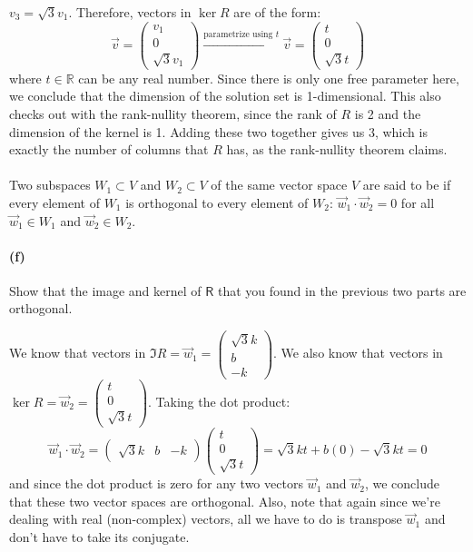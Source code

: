 \documentclass{article}
\begin{document}
\begin{solution}
	$v_3 = \sqrt{3} v_1$. Therefore, vectors in $\ker R$ are of the form: 
	\[
		\vec v = \begin{pmatrix} v_1\\0\\\sqrt{3} v_1 \end{pmatrix} \xrightarrow{\text{parametrize using $t$}} \vec v = \begin{pmatrix} t \\ 0 \\ \sqrt{3} t \end{pmatrix} 
	\] 
	where $t \in \mathbb R$ can be any real number. Since there is only one free parameter here, we conclude
	that the dimension of the solution set is 1-dimensional. This also checks out with the rank-nullity theorem,
	since the rank of $R$ is 2 and the dimension of the kernel is 1. Adding these two together gives us 3, which is exactly the 
	number of columns that $R$ has, as the rank-nullity theorem claims.  
\end{solution}


\paragraph{}
Two subspaces $W_{1}\subset V$ and $W_{2}\subset V$ of the same vector space $V$ are said to be  if every element of $W_{1}$ is orthogonal
to every element of $W_{2}$:  $\vec{w}_{1}\cdot\vec{w}_{2} = 0$ for all $\vec{w}_{1}\in W_{1}$ and $\vec{w}_{2}\in W_{2}$.


\paragraph{(f)}
Show that the image and kernel of $\mathsf{R}$ that you found in the previous two parts are orthogonal.

\begin{solution}
	We know that vectors in $\Im R = \vec w_1 = \begin{pmatrix} \sqrt{3} k\\b\\-k \end{pmatrix}$. We also know 
	that vectors in $\ker R = \vec w_2 = \begin{pmatrix} t\\0\\\sqrt{3} t \end{pmatrix}$. 
	Taking the dot product: 
	\[
		\vec w_1 \cdot \vec w_2 = \begin{pmatrix} \sqrt{3}k &b&-k \end{pmatrix} \begin{pmatrix} t\\0\\\sqrt{3}t
	\end{pmatrix} = \sqrt{3} kt + b(0) - \sqrt{3} kt = 0
	\] 
	and since the dot product is zero for any two vectors $\vec w_1$ and $\vec w_2$, we conclude that these
	two vector spaces are orthogonal. Also, note that again since we're dealing with real (non-complex) vectors, 
	all we have to do is transpose $\vec w_1$ and don't have to take its conjugate. 
\end{solution}
\end{document}
